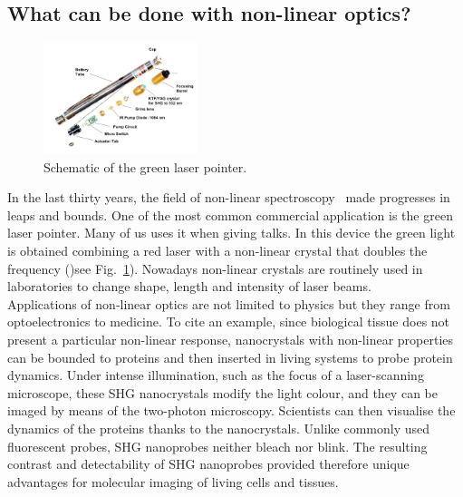 \subsection{What can be done with non-linear optics?} 
\begin{figure}
  \begin{center}
    \includegraphics[width=0.4\textwidth]{Figures/lasergreen}
  \end{center}
  \caption{Schematic of the green laser pointer. \label{greenlaser}}
\end{figure}
In the last thirty years, the field of non-linear spectroscopy~\cite{bloembergen1982nonlinear} made progresses in leaps and bounds. One of the most common commercial application is the green laser pointer. Many of us uses it when giving talks. In this device the green light is obtained combining a red laser with a non-linear crystal that doubles the frequency ()see Fig.~\ref{greenlaser}). Nowadays non-linear crystals are routinely used in laboratories to change shape, length and intensity of laser beams. \\
Applications of non-linear optics are not limited to physics but they range from optoelectronics to medicine. %
To cite an example, since biological tissue does not present a particular non-linear response, nanocrystals with non-linear properties can be bounded to proteins and then inserted in living systems to probe protein dynamics.
%
Under intense illumination, such as the focus of a laser-scanning microscope, these SHG nanocrystals modify the light colour, and they can be imaged by means of the two-photon microscopy. Scientists can then visualise the dynamics of the proteins thanks to the nanocrystals.
Unlike commonly used fluorescent probes, SHG nanoprobes neither bleach nor blink. The resulting contrast and detectability of SHG nanoprobes provided therefore unique advantages for molecular imaging of living cells and tissues. \cite{pantazis2010second}

